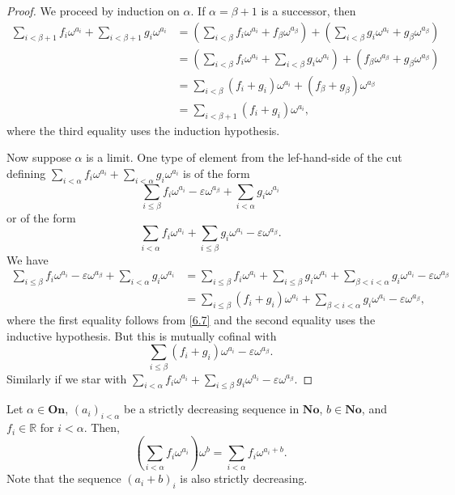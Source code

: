 \begin{proof} We proceed by induction on $\alpha$.  If $\alpha=\beta+1$ is a successor, then
\begin{align*} \sum_{i<\beta+1}f_i\omega^{a_i} + \sum_{i<\beta+1} g_i \omega^{a_i} & = \left ( \sum_{i<\beta} f_i\omega^{a_i} + f_\beta \omega^{a_\beta} \right ) + \left (  \sum_{i<\beta} g_i \omega^{a_i} + g_\beta \omega^{a_\beta} \right ) \\
	& = \left ( \sum_{i<\beta} f_i\omega^{a_i} + \sum_{i<\beta} g_i \omega^{a_i} \right ) + ( f_\beta \omega^{a_\beta} + g_\beta \omega^{a_\beta}) \\
	& = \sum_{i<\beta} (f_i+g_i) \omega^{a_i} + (f_\beta+g_\beta)\omega^{a_\beta} \\
	& = \sum_{i<\beta+1}(f_i+g_i)\omega^{a_i}, \end{align*}
where the third equality uses the induction hypothesis.

Now suppose $\alpha$ is a limit.  One type of element from the lef-hand-side of the cut defining   $\sum_{i<\alpha}f_i\omega^{a_i} + \sum_{i<\alpha} g_i \omega^{a_i}$ is of the form
$$\sum_{i\leq \beta} f_i \omega^{a_i}-\varepsilon  \omega^{a_\beta} +\sum_{i<\alpha} g_i \omega^{a_i}$$
or of the form
$$\sum_{i<\alpha} f_i \omega^{a_i} +\sum_{i\leq \beta} g_i \omega^{a_i} -\varepsilon  \omega^{a_\beta}.$$
We have
\begin{align*} \sum_{i\leq \beta} f_i \omega^{a_i}-\varepsilon  \omega^{a_\beta} +\sum_{i<\alpha} g_i \omega^{a_i} 
 & = \sum_{i\leq \beta} f_i \omega^{a_i} + \sum_{i\leq \beta} g_i \omega^{a_i} + \sum_{\beta< i<\alpha} g_i \omega^{a_i} -\varepsilon  \omega^{a_\beta} \\
  & = \sum_{i\leq \beta}(f_i+g_i)\omega^{a_i} + \sum_{\beta< i<\alpha} g_i \omega^{a_i} -\varepsilon  \omega^{a_\beta}, \end{align*}
  where the first equality follows from \eqref{6.7} and the second equality uses the inductive hypothesis.  But this is mutually cofinal with 
 $$\sum_{i\leq \beta}(f_i+g_i)\omega^{a_i} - \varepsilon \omega^{a_\beta}.$$
 Similarly if we star with $\sum_{i<\alpha} f_i \omega^{a_i} +\sum_{i\leq \beta} g_i \omega^{a_i} -\varepsilon  \omega^{a_\beta}.$
\end{proof}


\begin{lemma} \label{6.8} Let $\alpha \in \textbf{On}$, $(a_i)_{i<\alpha}$ be a strictly decreasing sequence in $\textbf{No}$, $b\in \textbf{No}$, and $f_i\in \mathds{R}$ for $i<\alpha$. Then,
$$\left ( \sum_{i<\alpha} f_i\omega^{a_i} \right ) \omega^b = \sum_{i<\alpha}f_i\omega^{a_i+b}.$$
Note that the sequence $(a_i+b)_i$ is also strictly decreasing.\end{lemma}

